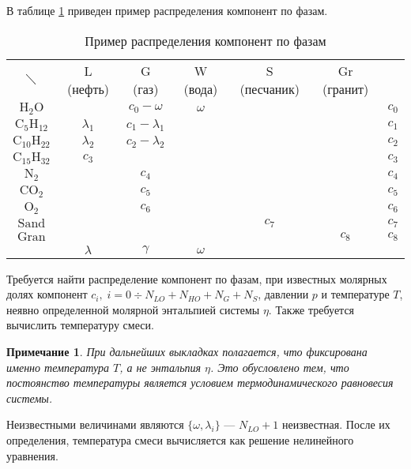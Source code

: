 \documentclass[12pt]{article}
\let\dividesymbol\div
\renewcommand{\div}{\operatorname{div}}
\newtheorem{note}{Примечание}[section]
\begin{document}
В таблице \ref{t:compphases} приведен пример распределения компонент по фазам.

\begin{table}[ht!]
\centering
\begin{tabular}{c|c|c|c|c|c|c}
\multicolumn{1}{c}{$\diagdown$}&
\multicolumn{1}{c}{L (нефть)}&
\multicolumn{1}{c}{G (газ)}&
\multicolumn{1}{c}{W (вода)}&
\multicolumn{1}{c}{S (песчаник)}&
\multicolumn{1}{c}{Gr (гранит)}&
\multicolumn{1}{c}{}\\
\cline{2-6}
$\mathrm{H_2O}$& & $c_0 - \omega$ & $\omega$ & & & $c_0$\\
\cline{1-6}
$\mathrm{C_5H_{12}}$& $\lambda_1$ & $c_1 - \lambda_1$ & & & & $c_1$\\
\cline{2-6}
$\mathrm{C_{10}H_{22}}$& $\lambda_2$ & $c_2 - \lambda_2$ & & & & $c_2$\\
\cline{1-6}
$\mathrm{C_{15}H_{32}}$& $c_3$ & & & & & $c_3$\\
\cline{1-6}
$\mathrm{N_2}$& & $c_4$ & & & & $c_4$\\
\cline{2-6}
$\mathrm{CO_2}$& & $c_5$ & & & & $c_5$\\
\cline{2-6}
$\mathrm{O_2}$& & $c_6$ & & & & $c_6$\\
\cline{1-6}
$\mathrm{Sand}$& & & & $c_7$ & & $c_7$\\
\cline{2-6}
$\mathrm{Gran}$& & & & & $c_8$ & $c_8$\\
\cline{2-6}
\multicolumn{1}{c}{}&
\multicolumn{1}{c}{$\lambda$}&
\multicolumn{1}{c}{$\gamma$}&
\multicolumn{1}{c}{$\omega$}&
\multicolumn{1}{c}{}\\
\end{tabular}
\caption{Пример распределения компонент по фазам}
\label{t:compphases}
\end{table}

Требуется найти распределение компонент по фазам, при известных молярных долях компонент $c_i, \; i = 0 \dividesymbol N_{LO} + N_{HO} + N_{G} + N_{S}$, давлении $p$ и температуре $T$, неявно определенной молярной энтальпией системы $\eta$. Также требуется вычислить температуру смеси.

\begin{note}
При дальнейших выкладках полагается, что фиксирована именно температура $T$, а не энтальпия $\eta$. Это обусловлено тем, что постоянство температуры является условием термодинамического равновесия системы.
\end{note}

Неизвестными величинами являются $\{\omega, \lambda_i\}$ --- $N_{LO} + 1$ неизвестная. После их определения, температура смеси вычисляется как решение нелинейного уравнения.
\end{document}
